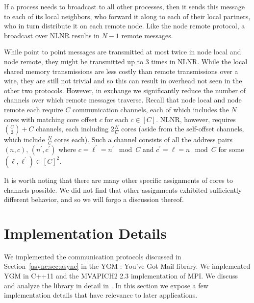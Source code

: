 \documentclass[10]{report}
\newcommand{\algoname}[1]{\textnormal{\textsc{#1}}}
\begin{document}
If a process needs to broadcast to all other processes, then it sends this message to each of its local neighbors, who forward it along to each of their local partners, who in turn distribute it on each remote node.
Like the node remote protocol, a broadcast over NLNR results in $N-1$ remote messages. 

While point to point messages are transmitted at most twice in node local and node remote, they might be transmitted up to 3 times in NLNR. 
While the local shared memory transmissions are less costly than remote transmissions over a wire, they are still not trivial and so this can result in overhead not seen in the other two protocols. 
However, in exchange we significantly reduce the number of channels over which remote messages traverse.
Recall that node local and node remote each require $C$ communication channels, each of which includes the $N$ cores with matching core offset $c$ for each $c \in [C]$. 
NLNR, however, requires ${C \choose 2} + C$ channels, each including $2\frac{N}{C}$ cores (aside from the self-offset channels, which include $\frac{N}{C}$ cores each).
Such a channel consists of all the address pairs $(n, c)$, $(n^\prime, c^\prime)$ where $c = \ell^\prime = n^\prime \mod C$ and $c^\prime = \ell = n \mod C$ for some $(\ell, \ell^\prime) \in [C]^2$.

It is worth noting that there are many other specific assignments of cores to channels possible. 
We did not find that other assignments exhibited sufficiently different behavior, and so we will forgo a discussion thereof. 


\section{Implementation Details} 
\label{async:sec:implementation}

We implemented the communication protocols discussed in Section~\ref{async:sec:async} in the \algoname{YGM} : You've Got Mail library.
We implemented YGM in C++11 and the MVAPICH2 2.3 implementation of MPI.  
We discuss and analyze the library in detail in \cite{priest2019you}.
In this section we expose a few implementation details that have relevance to later applications. 
\end{document}
